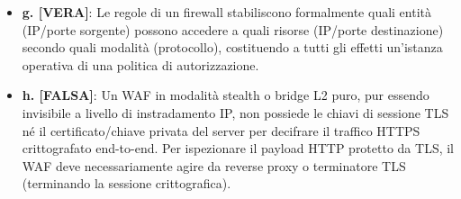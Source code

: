 \documentclass[11pt,a4paper]{article}
\begin{document}
\begin{solutionbox}
\begin{itemize}
    \item \textbf{g. [VERA]}: Le regole di un firewall stabiliscono formalmente quali entità (IP/porte sorgente) possono accedere a quali risorse (IP/porte destinazione) secondo quali modalità (protocollo), costituendo a tutti gli effetti un'istanza operativa di una politica di autorizzazione.
    \item \textbf{h. [FALSA]}: Un WAF in modalità stealth o bridge L2 puro, pur essendo invisibile a livello di instradamento IP, non possiede le chiavi di sessione TLS né il certificato/chiave privata del server per decifrare il traffico HTTPS crittografato end-to-end. Per ispezionare il payload HTTP protetto da TLS, il WAF deve necessariamente agire da reverse proxy o terminatore TLS (terminando la sessione crittografica).
\end{itemize}


\end{solutionbox}
\end{document}
